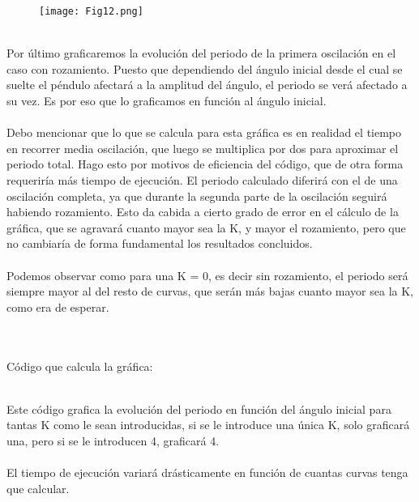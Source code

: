 \documentclass{article}
\begin{document}
\begin{figure}[h]
\centering
\texttt{[image: Fig12.png]}
\end{figure}
    
\hfill \break \\
    
Por último graficaremos la evolución del periodo de la primera oscilación en el caso con rozamiento. Puesto que dependiendo del ángulo inicial desde el cual se suelte el péndulo afectará a la amplitud del ángulo, el periodo se verá afectado a su vez. Es por eso que lo graficamos en función al ángulo inicial. \\ \\ Debo mencionar que lo que se calcula para esta gráfica es en realidad el tiempo en recorrer media oscilación, que luego se multiplica por dos para aproximar el periodo total. Hago esto por motivos de eficiencia del código, que de otra forma requeriría más tiempo de ejecución. El periodo calculado diferirá con el de una oscilación completa, ya que durante la segunda parte de la oscilación seguirá habiendo rozamiento. Esto da cabida a cierto grado de error en el cálculo de la gráfica, que se agravará cuanto mayor sea la K, y mayor el rozamiento, pero que no cambiaría de forma fundamental los resultados concluidos. \\ \\ Podemos observar como para una K = 0, es decir sin rozamiento, el periodo será siempre mayor al del resto de curvas, que serán más bajas cuanto mayor sea la K, como era de esperar.
    
\pagebreak
\hfill \break \\
\hfill \break \\
Código que calcula la gráfica:

\hfill \break \\
Este código grafica la evolución del periodo en función del ángulo inicial para tantas K como le sean introducidas, si se le introduce una única K, solo graficará una, pero si se le introducen 4, graficará 4. \\ \\
El tiempo de ejecución variará drásticamente en función de cuantas curvas tenga que calcular.
\end{document}
